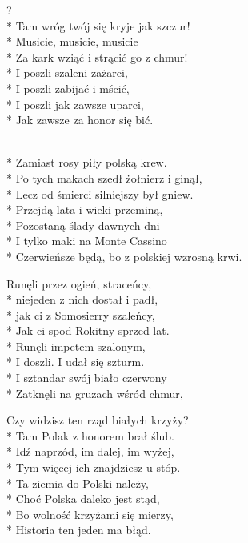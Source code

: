 \begin{lyrics}[longestline={Czerwieńsze będą, bo z polskiej wzrosną krwi.}]

?\\*
Tam wróg twój się kryje jak szczur!\\*
Musicie, musicie, musicie\\*
Za kark wziąć i strącić go z chmur!\\*
I poszli szaleni zażarci,\\*
I poszli zabijać i mścić,\\*
I poszli jak zawsze uparci,\\*
Jak zawsze za honor się bić.

\begin{chorus}
\\*
Zamiast rosy piły polską krew.\\*
Po tych makach szedł żołnierz i ginął,\\*
Lecz od śmierci silniejszy był gniew.\\*
Przejdą lata i wieki przeminą,\\*
Pozostaną ślady dawnych dni\\*
I tylko maki na Monte Cassino\\*
Czerwieńsze będą, bo z polskiej wzrosną krwi.
\end{chorus}

Runęli przez ogień, straceńcy,\\*
niejeden z nich dostał i padł,\\*
jak ci z Somosierry szaleńcy,\\*
Jak ci spod Rokitny sprzed lat.\\*
Runęli impetem szalonym,\\*
I doszli. I udał się szturm.\\*
I sztandar swój biało czerwony\\*
Zatknęli na gruzach wśród chmur,

\chorusref

Czy widzisz ten rząd białych krzyży?\\*
Tam Polak z honorem brał ślub.\\*
Idź naprzód, im dalej, im wyżej,\\*
Tym więcej ich znajdziesz u stóp.\\*
Ta ziemia do Polski należy,\\*
Choć Polska daleko jest stąd,\\*
Bo wolność krzyżami się mierzy,\\*
Historia ten jeden ma błąd.

\chorusref
\end{lyrics}



